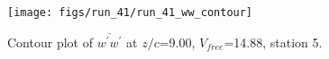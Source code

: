 \begin{figure}[H]
\centering
\texttt{[image: figs/run\_41/run\_41\_ww\_contour]}
\caption{Contour plot of $\overline{w^\prime w^\prime}$ at $z/c$=9.00, $V_{free}$=14.88, station 5.}
\label{fig:run_41_ww_contour}
\end{figure}


